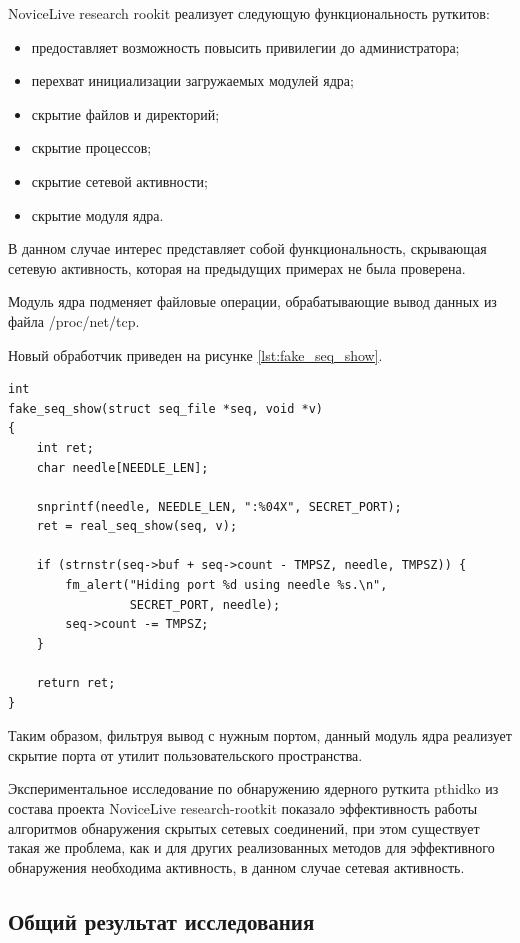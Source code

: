 \documentclass{gost7.32-2001}
\begin{document}
NoviceLive research rookit реализует следующую функциональность руткитов:
\begin{itemize}
\item
  предоставляет возможность повысить привилегии до администратора;
\item
  перехват инициализации загружаемых модулей ядра;
\item
  скрытие файлов и директорий;
\item
  скрытие процессов;
\item
  скрытие сетевой активности;
\item
  скрытие модуля ядра.
\end{itemize}

В данном случае интерес представляет собой функциональность,
скрывающая сетевую активность, которая на предыдущих примерах не была
проверена.

Модуль ядра подменяет файловые операции, обрабатывающие вывод данных
из файла /proc/net/tcp.

Новый обработчик приведен на рисунке \ref{lst:fake_seq_show}.

\begin{lstlisting}[caption={Подмененная функция},
    captionpos=b, float, label={lst:fake_seq_show}]
int
fake_seq_show(struct seq_file *seq, void *v)
{
    int ret;
    char needle[NEEDLE_LEN];

    snprintf(needle, NEEDLE_LEN, ":%04X", SECRET_PORT);
    ret = real_seq_show(seq, v);

    if (strnstr(seq->buf + seq->count - TMPSZ, needle, TMPSZ)) {
        fm_alert("Hiding port %d using needle %s.\n",
                 SECRET_PORT, needle);
        seq->count -= TMPSZ;
    }

    return ret;
}
\end{lstlisting}

Таким образом, фильтруя вывод с нужным портом, данный модуль ядра
реализует скрытие порта от утилит пользовательского пространства.

Экспериментальное исследование по обнаружению ядерного руткита pthidko
из состава проекта NoviceLive research-rootkit показало эффективность
работы алгоритмов обнаружения скрытых сетевых соединений, при этом
существует такая же проблема, как и для других реализованных методов
\dash для эффективного обнаружения необходима активность, в данном
случае сетевая активность.

\subsection{Общий результат исследования}
\end{document}
